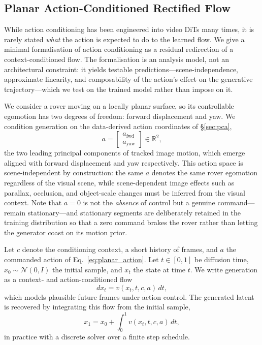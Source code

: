\documentclass[letterpaper]{article} %
\begin{document}
\subsection{Planar Action-Conditioned Rectified Flow}
\label{sec:planar}

While action conditioning has been engineered into video DiTs many times, it is rarely stated \emph{what} the action is expected to do to the learned flow. We give a minimal formalisation of action conditioning as a residual redirection of a context-conditioned flow. The formalisation is an analysis model, not an architectural constraint: it yields testable predictions---scene-independence, approximate linearity, and composability of the action's effect on the generative trajectory---which we test on the trained model rather than impose on it.

We consider a rover moving on a locally planar surface, so its controllable egomotion has two degrees of freedom: forward displacement and yaw. We condition generation on the data-derived action coordinates of \S\ref{sec:pca},
\begin{equation}
    a =
    \begin{bmatrix}
        a_{\mathrm{fwd}} \\
        a_{\mathrm{yaw}}
    \end{bmatrix}
    \in \mathbb{R}^2,
    \label{eq:planar_action}
\end{equation}
the two leading principal components of tracked image motion, which emerge aligned with forward displacement and yaw respectively. This action space is scene-independent by construction: the same $a$ denotes the same rover egomotion regardless of the visual scene, while scene-dependent image effects such as parallax, occlusion, and object-scale changes must be inferred from the visual context. Note that $a=0$ is not the \emph{absence} of control but a genuine command---remain stationary---and stationary segments are deliberately retained in the training distribution so that a zero command brakes the rover rather than letting the generator coast on its motion prior.

Let $c$ denote the conditioning context, a short history of frames, and $a$ the commanded action of Eq.~\eqref{eq:planar_action}. Let $t\in[0,1]$ be diffusion time, $x_0\sim\mathcal{N}(0,I)$ the initial sample, and $x_t$ the state at time $t$. We write generation as a context- and action-conditioned flow
\begin{equation}
    d x_t = v(x_t,t,c,a)\,dt,
    \label{eq:conditioned_flow}
\end{equation}
which models plausible future frames under action control. The generated latent is recovered by integrating this flow from the initial sample,
\begin{equation}
    x_1
    =
    x_0
    +
    \int_0^1 v(x_t,t,c,a)\,dt,
    \label{eq:flow_integral}
\end{equation}
in practice with a discrete solver over a finite step schedule.
\end{document}

